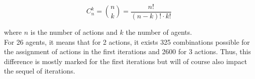 \documentclass{article}
\begin{document}
$$ C_{n}^{k} = {n \choose k} = \frac{n!}{(n-k)! \cdot k!}$$
 
\noindent
where $n$ is the number of actions and $k$ the number of agents. \\

\noindent
For 26 agents, it means that for 2 actions, it exists 325 combinations possible for the assignment of actions in the first iterations and 2600 for 3 actions. Thus, this difference is mostly marked for the first iterations but will of course also impact the sequel of iterations. 
 
\end{document}
